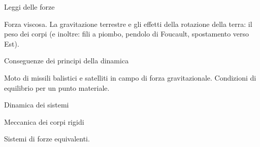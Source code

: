 Leggi delle forze

Forza viscosa. 
La gravitazione terrestre e gli effetti della rotazione della terra: il peso dei corpi (e inoltre: fili a piombo, pendolo di Foucault, spostamento verso Est).



Conseguenze dei principi della dinamica

Moto di missili balistici e satelliti in campo di forza gravitazionale. 
Condizioni di equilibrio per un punto materiale.



Dinamica dei sistemi




Meccanica dei corpi rigidi

Sistemi di forze equivalenti. 



